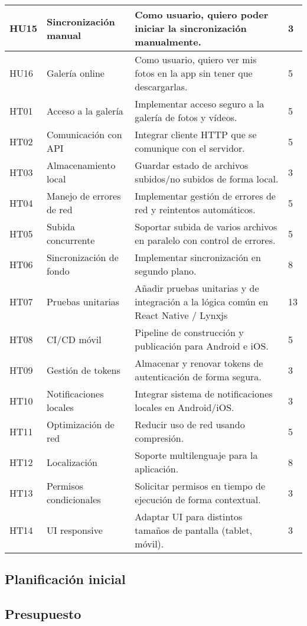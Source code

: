 \begin{tabularx}{\textwidth}{|l|l|>{\raggedright\arraybackslash}X|p{2cm}|}
    \hline
    HU15 & Sincronización manual & Como usuario, quiero poder iniciar la sincronización manualmente. & 3 \\
    \hline
    HU16 & Galería online & Como usuario, quiero ver mis fotos en la app sin tener que descargarlas. & 5 \\
    \hline
    HT01 & Acceso a la galería & Implementar acceso seguro a la galería de fotos y vídeos. & 5 \\
    \hline
    HT02 & Comunicación con API & Integrar cliente HTTP que se comunique con el servidor. & 5 \\
    \hline
    HT03 & Almacenamiento local & Guardar estado de archivos subidos/no subidos de forma local. & 3 \\
    \hline
    HT04 & Manejo de errores de red & Implementar gestión de errores de red y reintentos automáticos. & 5 \\
    \hline
    HT05 & Subida concurrente & Soportar subida de varios archivos en paralelo con control de errores. & 5 \\
    \hline
    HT06 & Sincronización de fondo & Implementar sincronización en segundo plano. & 8 \\
    \hline
    HT07 & Pruebas unitarias & Añadir pruebas unitarias y de integración a la lógica común en React Native / Lynxjs & 13 \\
    \hline
    HT08 & CI/CD móvil & Pipeline de construcción y publicación para Android e iOS. & 5 \\
    \hline
    HT09 & Gestión de tokens & Almacenar y renovar tokens de autenticación de forma segura. & 3 \\
    \hline
    HT10 & Notificaciones locales & Integrar sistema de notificaciones locales en Android/iOS. & 3 \\
    \hline
    HT11 & Optimización de red & Reducir uso de red usando compresión. & 5 \\
    \hline
    HT12 & Localización & Soporte multilenguaje para la aplicación. & 8 \\
    \hline
    HT13 & Permisos condicionales & Solicitar permisos en tiempo de ejecución de forma contextual. & 3 \\
    \hline
    HT14 & UI responsive & Adaptar UI para distintos tamaños de pantalla (tablet, móvil). & 3 \\
    \hline
\end{tabularx}


\subsection{Planificación inicial}

\subsection{Presupuesto}

